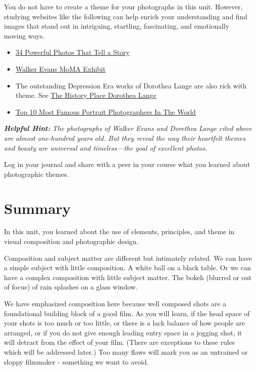 \documentclass[
]{book}
\providecommand{\tightlist}{%
  \setlength{\itemsep}{0pt}\setlength{\parskip}{0pt}}
\begin{document}
\begin{reflect}
You do not have to create a theme for your photographs in this unit. However, studying websites like the following can help enrich your understanding and find images that stand out in intriguing, startling, fascinating, and emotionally moving ways.

\begin{itemize}
\tightlist
\item
  \href{https://www.jotform.com/blog/35-powerful-photos-that-each-tells-a-story/}{34 Powerful Photos That Tell a Story}
\item
  \href{https://www.moma.org/artists/1777}{Walker Evans MoMA Exhibit}\\
\item
  The outstanding Depression Era works of Dorothea Lange are also rich with theme. See \href{http://www.historyplace.com/unitedstates/lange/}{The History Place Dorothea Lange}
\item
  \href{https://www.boredpanda.com/top-10-photographers-for-travel-portraits/?utm_source=google\&utm_medium=organic\&utm_campaign=organic}{Top 10 Most Famous Portrait Photographers In The World}
\end{itemize}

\textbf{\emph{Helpful Hint:}} \emph{The photographs of Walker Evans and Dorethea Lange cited above are almost one-hundred years old. But they reveal the way their heartfelt themes and beauty are universal and timeless---the goal of excellent photos.}

Log in your journal and share with a peer in your course what you learned about photographic themes.
\end{reflect}

\hypertarget{summary-2}{%
\section*{Summary}\label{summary-2}}

In this unit, you learned about the use of elements, principles, and theme in visual composition and photographic design.

Composition and subject matter are different but intimately related. We can have a simple subject with little composition. A white ball on a black table. Or we can have a complex composition with little subject matter. The bokeh (blurred or out of focus) of rain splashes on a glass window.

We have emphasized composition here because well composed shots are a foundational building block of a good film. As you will learn, if the head space of your shots is too much or too little, or there is a lack balance of how people are arranged, or if you do not give enough leading entry space in a jogging shot, it will detract from the effect of your film. (There are exceptions to these rules which will be addressed later.) Too many flaws will mark you as an untrained or sloppy filmmaker - something we want to avoid.
\end{document}
